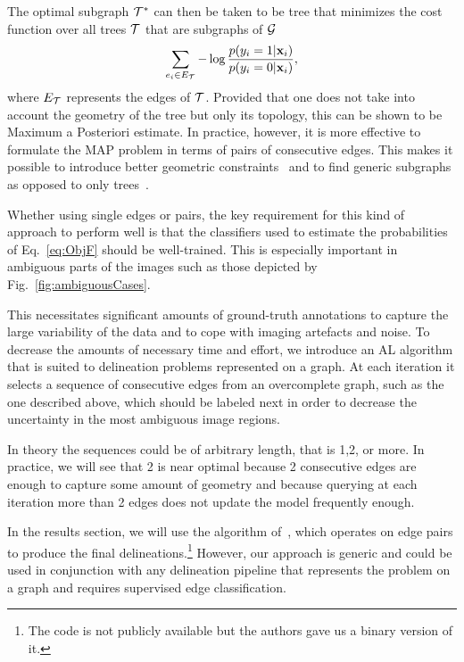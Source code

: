 \documentclass[10pt,twocolumn,letterpaper]{article}
\begin{document}
The  optimal subgraph  $\mathcal{T}^*$  can  then  be taken  to  be tree  that
minimizes the cost function over all trees $\mathcal{T}$ that are subgraphs of $\mathcal{G}$\begin{equation}
\sum_{e_i\in E_{\mathcal{T}}}-\log\frac{p(y_i = 1|\mathbf{x}_i)}{p(y_i = 0|\mathbf{x}_i)}  ,
\label{eq:ObjF}
\end{equation}
where $E_{\mathcal{T}}$ represents the edges of  $\mathcal{T}$.  Provided that one does not take
into account the geometry  of the tree but only its topology,  this can be shown
to be Maximum a Posteriori estimate.  In practice, however, it is more effective
to formulate the MAP problem in terms  of pairs of consecutive edges. This makes
it  possible to  introduce better geometric  constraints~\cite{Turetken12} and  to find
generic subgraphs as opposed to only trees~\cite{Turetken13a}.

Whether  using single  edges or  pairs,  the key  requirement for  this kind  of
approach  to  perform  well  is  that  the  classifiers  used  to  estimate  the
probabilities of Eq.~\ref{eq:ObjF} should be well-trained. This is especially important
in ambiguous parts of the images such as those depicted by Fig.~\ref{fig:ambiguousCases}.

This  necessitates
significant amounts of ground-truth annotations to capture the large variability
of the  data and  to cope  with imaging  artefacts and  noise. To decrease the amounts of necessary time and  effort, we  introduce an  AL algorithm  that is
suited to  delineation problems represented  on a  graph.  At each  iteration it
selects a sequence of consecutive edges  from an overcomplete graph, such as the
one  described above,  which should  be labeled  next in  order to  decrease the
uncertainty in the most ambiguous image regions.

In theory the sequences  could be of arbitrary length, that is  1,2, or more. In
practice, we  will see that  2 is near optimal  because 2 consecutive  edges are
enough to capture some amount of geometry and because querying at each iteration more than 2 edges does not update the model frequently enough.

In the results  section, we will use the  algorithm of~\cite{Turetken13a}, which
operates  on edge  pairs to  produce the  final
delineations.\footnote{The code is  not publicly available but  the authors gave
  us a binary version of it.} However, our approach is generic and could be used
in conjunction  with any delineation pipeline  that represents the problem  on a
graph and requires supervised edge classification.
\end{document}
